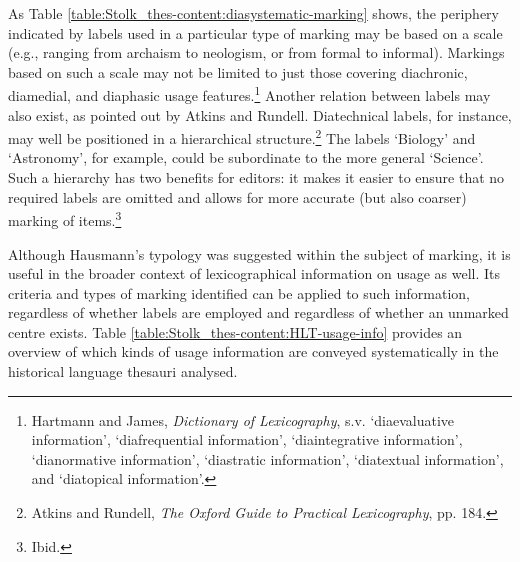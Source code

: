 As Table \ref{table:Stolk_thes-content:diasystematic-marking} shows, the periphery indicated by labels used in a particular type of marking may be based on a scale (e.g., ranging from archaism to neologism, or from formal to informal). Markings based on such a scale may not be limited to just those covering diachronic, diamedial, and diaphasic usage features.\footnote{Hartmann and James, \textit{Dictionary of Lexicography}, s.v. `diaevaluative information', `diafrequential information', `diaintegrative information', `dianormative information', `diastratic information', `diatextual information', and `diatopical information'.} Another relation between labels may also exist, as pointed out by Atkins and Rundell. Diatechnical labels, for instance, may well be positioned in a hierarchical structure.\footnote{Atkins and Rundell, \textit{The Oxford Guide to Practical Lexicography}, pp. 184.} The labels `Biology' and `Astronomy', for example, could be subordinate to the more general `Science'. Such a hierarchy has two benefits for editors: it makes it easier to ensure that no required labels are omitted and allows for more accurate (but also coarser) marking of items.\footnote{Ibid.}%


Although Hausmann's typology was suggested within the subject of marking, it is useful in the broader context of lexicographical information on usage as well. Its criteria and types of marking identified can be applied to such information, regardless of whether labels are employed and regardless of whether an unmarked centre exists. Table \ref{table:Stolk_thes-content:HLT-usage-info} provides an overview of which kinds of usage information are conveyed systematically in the historical language thesauri analysed.


